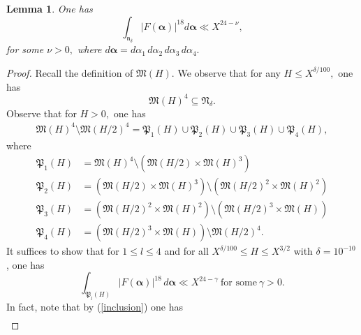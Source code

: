 \documentclass{amsart}%
\numberwithin{equation}{section}
\newtheorem{lemma}[theorem]{Lemma}
\theoremstyle{remark}
\newcommand{\1}{\mathbbm{1}}
\begin{document}
\begin{lemma}\label{prop3.2}
    One has
    \begin{equation*}\label{claim in lemma 3.2}
\int_{\mathfrak{n}_{\delta}}|F(\boldsymbol{\alpha})|^{18}d\boldsymbol{\alpha}\ll X^{24-\nu},
    \end{equation*}
    for some $\nu>0,$ where $d\boldsymbol{\alpha}=d\alpha_1 \, d\alpha_2 \, d\alpha_3 \, d\alpha_4.$
\end{lemma}
\begin{proof}
 Recall the definition of $\mathfrak{M}(H)$. We observe that for any $H\leq X^{\delta/100},$ one has
\begin{equation}\label{inclusion}
    \mathfrak{M}(H)^4\subseteq \mathfrak{N}_{\delta}.
\end{equation}
Observe that for $H>0,$ one has
\begin{equation}\label{pruning argument crucial}
\begin{aligned}
   \mathfrak{M}(H)^4 \setminus \mathfrak{M}(H/2)^4
   =\mathfrak{P}_1(H)\cup \mathfrak{P}_2(H)\cup\mathfrak{P}_3(H)\cup \mathfrak{P}_4(H),
\end{aligned}
\end{equation}
where 
\begin{equation*}
    \begin{aligned}
        \mathfrak{P}_1(H)&=\mathfrak{M}(H)^4\setminus(\mathfrak{M}(H/2)\times\mathfrak{M}(H)^3)\\
 \mathfrak{P}_2(H)&=  (\mathfrak{M}(H/2)\times\mathfrak{M}(H)^3)\setminus (\mathfrak{M}(H/2)^2\times\mathfrak{M}(H)^2)\\
  \mathfrak{P}_3(H)&= (\mathfrak{M}(H/2)^2\times\mathfrak{M}(H)^2)\setminus (\mathfrak{M}(H/2)^3\times\mathfrak{M}(H))\\
  \mathfrak{P}_4(H)&=  (\mathfrak{M}(H/2)^3\times\mathfrak{M}(H))\setminus \mathfrak{M}(H/2)^4.\end{aligned}
\end{equation*}
It suffices to show that for $1\leq l\leq 4$ and for all $X^{\delta/100}\leq H\leq X^{3/2}$ with $\delta=10^{-10}$, one has
\begin{equation}\label{claim}
\int_{ \mathfrak{P}_l(H)}|F(\boldsymbol{\alpha})|^{18} \, d\boldsymbol{\alpha}\ll X^{24-\gamma}\ \text{for some}\ \gamma>0.
\end{equation}
In fact, note that by (\ref{inclusion}) one has
\begin{equation}\label{fdsa}
\begin{aligned}

\end{aligned}
\end{equation}
\end{proof}
\end{document}
